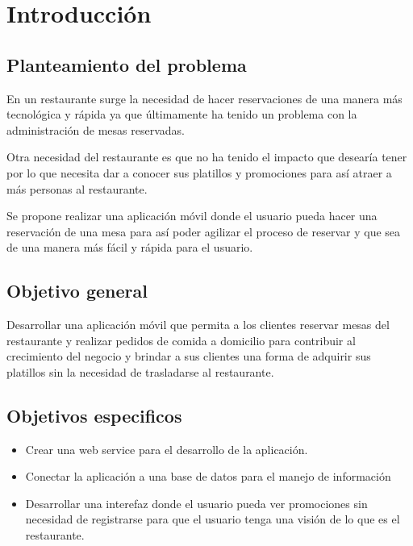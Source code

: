 \chapter{Introducci\'on}
\section{Planteamiento del problema}

En un restaurante surge la necesidad de hacer reservaciones de una manera m\'as tecnol\'ogica y r\'apida ya que \'ultimamente ha tenido un problema con la administración de mesas reservadas.

Otra necesidad del restaurante es que no ha tenido el impacto que desear\'ia tener por lo que necesita dar a conocer sus platillos y promociones para as\'i atraer a m\'as personas al restaurante.

Se propone realizar una aplicación m\'ovil donde el usuario pueda hacer una reservaci\'on de una mesa para as\'i poder agilizar el proceso de reservar y que sea de una manera m\'as f\'acil y r\'apida para el usuario. 


\section{Objetivo general}

Desarrollar una aplicaci\'on m\'ovil que permita a los clientes reservar mesas del restaurante y realizar pedidos de comida a domicilio para contribuir al crecimiento del negocio y brindar a sus clientes una forma de adquirir sus platillos sin la necesidad de trasladarse al restaurante.


\section{Objetivos especificos}


\begin{itemize}
    \item Crear una web service para el desarrollo de la aplicaci\'on.
    \item Conectar la aplicaci\'on a una base de datos para el manejo de información
    \item Desarrollar una interefaz donde el usuario pueda ver promociones sin necesidad de registrarse para que el usuario tenga una visi\'on de lo que es el restaurante.  
   
    \end{itemize}